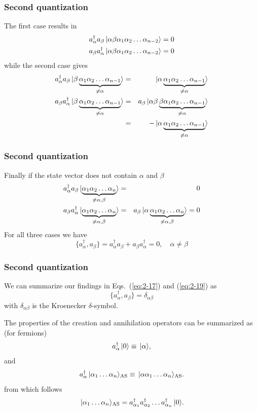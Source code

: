 {
  \frametitle{Second quantization}
\begin{small}
{\scriptsize
The first case results in
\begin{eqnarray}
	a_\alpha^\dagger a_\beta \ket{\alpha\beta\alpha_1\alpha_2 \dots \alpha_{n-2}} = 0 \nonumber \\
	a_\beta a_\alpha^\dagger \ket{\alpha\beta\alpha_1\alpha_2 \dots \alpha_{n-2}} = 0 \label{eq:2-18a}
\end{eqnarray}
while the second case gives
\begin{eqnarray}
	 a_\alpha^\dagger a_\beta \ket{\beta \underbrace{\alpha_1\alpha_2 \dots \alpha_{n-1}}_{\neq \alpha}} &=& 
	 	\ket{\alpha \underbrace{\alpha_1\alpha_2 \dots \alpha_{n-1}}_{\neq  \alpha}} \nonumber \\
	a_\beta a_\alpha^\dagger \ket{\beta \underbrace{\alpha_1\alpha_2 \dots \alpha_{n-1}}_{\neq \alpha}} &=&
		a_\beta \ket{\alpha\beta\underbrace{\beta \alpha_1\alpha_2 \dots \alpha_{n-1}}_{\neq \alpha}} \nonumber \\
	&=& - \ket{\alpha\underbrace{\alpha_1\alpha_2 \dots \alpha_{n-1}}_{\neq \alpha}} \label{eq:2-18b}
\end{eqnarray}
}
\end{small}
}
\frame
{
  \frametitle{Second quantization}
\begin{small}
{\scriptsize
Finally if the state vector does not contain $\alpha$ and $\beta$
\begin{eqnarray}
	a_\alpha^\dagger a_\beta \ket{\underbrace{\alpha_1\alpha_2 \dots \alpha_{n}}_{\neq \alpha,\beta}} &=& 0 \nonumber \\
	a_\beta a_\alpha^\dagger \ket{\underbrace{\alpha_1\alpha_2 \dots \alpha_{n}}_{\neq \alpha,\beta}} &=& 
		a_\beta \ket{\alpha \underbrace{\alpha_1\alpha_2 \dots \alpha_{n}}_{\neq \alpha,\beta}} = 0 \label{eq:2-18c}
\end{eqnarray}
For all three cases we have
\begin{equation}
	\{a_\alpha^\dagger,a_\beta \} = a_\alpha^\dagger a_\beta + a_\beta a_\alpha^\dagger = 0, \quad \alpha \neq \beta \label{eq:2-19}
\end{equation}
}
\end{small}
}
\frame
{
  \frametitle{Second quantization}
\begin{small}
{\scriptsize
We can summarize  our findings in Eqs.~(\ref{eq:2-17}) and (\ref{eq:2-19}) as 
\begin{equation}
	\{a_\alpha^\dagger,a_\beta \} = \delta_{\alpha\beta} \label{eq:2-20}
\end{equation}
with  $\delta_{\alpha\beta}$ is the Kroenecker $\delta$-symbol.

The properties of the creation and annihilation operators can be summarized as (for fermions)
\[
	a_\alpha^\dagger\,|{0}\rangle \equiv  \,|{\alpha}\rangle,
\]
and 
\[
	a_\alpha^\dagger\,|{\alpha_1\dots \alpha_n}\rangle_{\mathrm{\mathrm{AS}}} \equiv  \,|{\alpha\alpha_1\dots \alpha_n}\rangle_{\mathrm{\mathrm{AS}}}. 
\]
from which follows
\[
        \,|{\alpha_1\dots \alpha_n}\rangle_{\mathrm{\mathrm{AS}}} = a_{\alpha_1}^\dagger a_{\alpha_2}^\dagger \dots a_{\alpha_n}^\dagger \,|{0}\rangle.
\]
}
\end{small}
}
